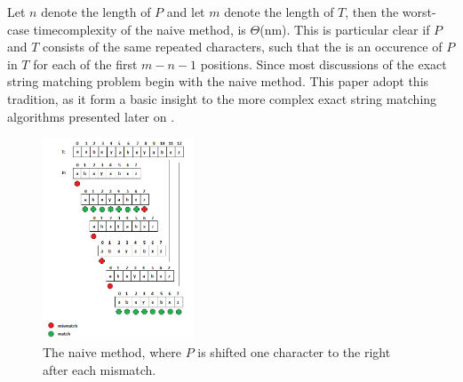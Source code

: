 \documentclass[12pt]{article} %
\begin{document}
\newline
Let $n$ denote the length of $P$ and let $m$ denote the length of $T$, then the worst-case timecomplexity of the naive method, is $\Theta$(nm). This is particular clear if $P$ and $T$ consists of the same repeated characters, such that the is an occurence of $P$ in $T$ for each of the first $m - n - 1$ positions.
\newline
Since most discussions of the exact string matching problem begin with the naive method. This paper adopt this tradition, as it form a basic insight to the more complex exact string matching algorithms presented later on \cite{gusfield}.
\begin{figure}[H]
    \centering
    \includegraphics[width=0.4\textwidth]{comparisonbased1}
    \captionsetup{width=0.8\textwidth}
    \caption{The naive method, where $P$ is shifted one character to the right after each mismatch.}
    \label{fig:comparisonbased1}
\end{figure}
\end{document}
